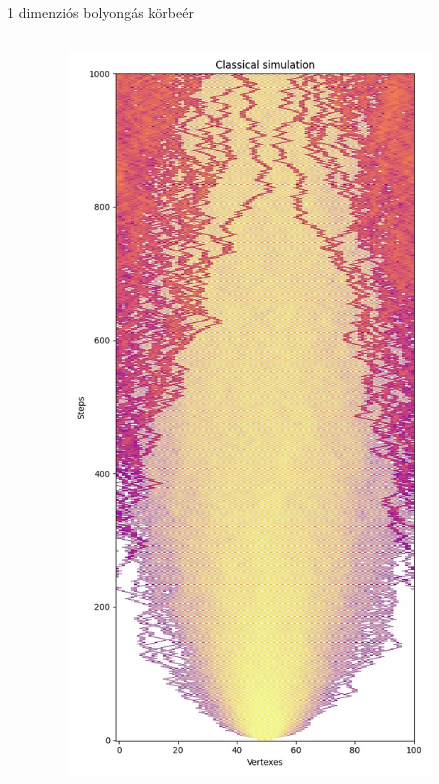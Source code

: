 \documentclass[aspectratio=169]{beamer}
\begin{document}
\begin{frame}{1 dimenziós bolyongás körbeér}

  \begin{columns}[onlytextwidth]
    \begin{column}{.25\textwidth}
    \end{column}
    \begin{column}{.25\textwidth}
      \begin{figure}
        \includegraphics[width=0.9\textwidth]{./tdk_figures/results/path/classical.jpg}

\end{figure}
\end{column}
\end{columns}
\end{frame}
\end{document}
